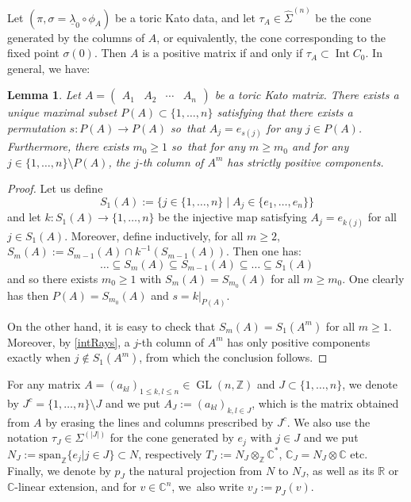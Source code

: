 \documentclass[JEP,XML,SOM,Unicode,NoFloatCountersInSection]{cedram}
\newtheorem{lemma}[theorem]{Lemma}
\theoremstyle{definition}
\let\sminus\setminus
\let\un\underline
\newcommand{\CC}{\mathbb{C}}
\newcommand{\RR}{\mathbb{R}}
\newcommand{\ZZ}{\mathbb{Z}}
\DeclareMathOperator{\GL}{GL}
\DeclareMathOperator{\Int}{Int}
\begin{document}
Let $(\pi,\sigma=\un\lambda_0\circ\phi_A)$ be a toric Kato data, and let $\tau_A\in\hat{\Sigma}^{(n)}$ be the cone generated by the columns of $A$, or equivalently, the cone corresponding to the fixed point $\sigma(0)$. Then $A$ is a positive matrix if and only if $\tau_A\subset\Int C_0$. In general, we have:

\begin{lemma}\label{permA}
Let $A=\begin{pmatrix}
A_1 &A_2 &\cdots &A_n\end{pmatrix}$ be a toric Kato matrix.
There exists a unique maximal subset $P(A)\subset\{1,\ldots, n\}$ satisfying that there exists a permutation $s:P(A)\to P(A)$ so~that $A_j=e_{s(j)}$ for any $j\in P(A)$. Furthermore, there exists $m_0\geq 1$ so~that for any $m\geq m_0$ and for any $j\in\{1,\ldots, n\}\sminus P(A)$, the $j$-th column of $A^m$ has strictly positive components.
\end{lemma}
\begin{proof}
Let us define
\begin{equation*}
S_1(A):=\{j\in\{1,\ldots, n\}\mid A_j\in\{e_1,\ldots, e_n\}\}
\end{equation*}
and let $k:S_1(A)\to \{1,\ldots, n\}$ be the injective map satisfying $A_j=e_{k(j)}$ for all $j\in S_1(A)$. Moreover, define inductively, for all $m\geq 2$, $S_m(A):=S_{m-1}(A)\cap k^{-1}(S_{m-1}(A))$. Then one has:
\begin{equation*}
\ldots\subseteq S_m(A)\subseteq S_{m-1}(A)\subseteq\ldots\subseteq S_1(A)
\end{equation*}
and so there exists $m_0\geq 1$ with $S_m(A)=S_{m_0}(A)$ for all $m\geq m_0$. One clearly has then $P(A)=S_{m_0}(A)$ and $s=k|_{P(A)}$.

On the other hand, it is easy to check that $S_m(A)=S_1(A^m)$ for all $m\geq 1$. Moreover, by \eqref{intRays}, a $j$-th column of $A^m$ has only positive components exactly when $j\notin S_1(A^m)$, from which the conclusion follows.
\end{proof}

For any matrix $A=(a_{kl})_{1\leq k,l\leq n}\in\GL(n,\ZZ)$ and $J\subset\{1,\ldots, n\}$, we denote by $J^c=\{1,\ldots, n\}\sminus J$ and we put $A_J:=(a_{kl})_{k,l \in J}$, which is the matrix obtained from $A$ by erasing the lines and columns prescribed by $J^c$. We also use the notation $\tau_J\in\Sigma^{(|J|)}$ for the cone generated by $e_j$ with $j\in J$ and we put $N_J:=\mathrm{span}_{\ZZ}\{e_j|j\in J\}\subset N$, respectively $T_J:=N_J\otimes_\ZZ\CC^*$, $\CC_J=N_J\otimes \CC$ etc. Finally, we denote by $p_J$ the natural projection from $N$ to $N_J$, as well as its $\RR$ or $\CC$-linear extension, and for $v\in \CC^n$, we~also write $v_J:=p_J(v)$.
\end{document}
